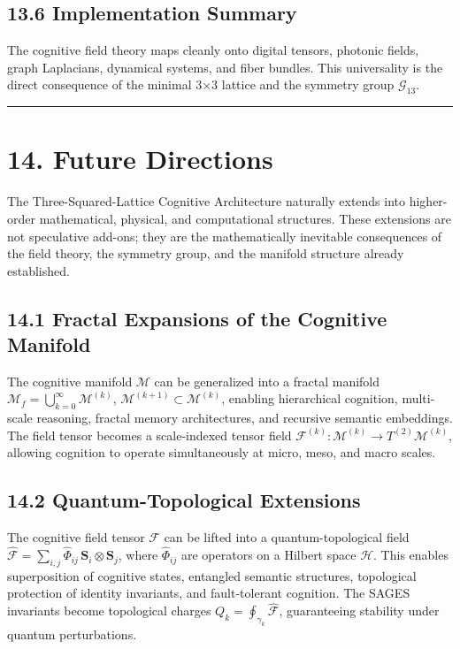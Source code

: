 \subsection{13.6 Implementation Summary}\label{implementation-summary}

The cognitive field theory maps cleanly onto digital tensors, photonic fields, graph Laplacians, dynamical systems, and fiber bundles. This universality is the direct consequence of the minimal 3×3 lattice and the symmetry group \(\mathcal{G}_{13}\).

\begin{center}\rule{0.5\linewidth}{0.5pt}\end{center}

\section{14. Future Directions}\label{future-directions}

The Three-Squared-Lattice Cognitive Architecture naturally extends into higher-order mathematical, physical, and computational structures. These extensions are not speculative add-ons; they are the mathematically inevitable consequences of the field theory, the symmetry group, and the manifold structure already established.

\subsection{14.1 Fractal Expansions of the Cognitive Manifold}\label{fractal-expansions-of-the-cognitive-manifold}

The cognitive manifold \(\mathcal{M}\) can be generalized into a fractal manifold \(\mathcal{M}_f = \bigcup_{k=0}^{\infty} \mathcal{M}^{(k)}\), \(\mathcal{M}^{(k+1)} \subset \mathcal{M}^{(k)}\), enabling hierarchical cognition, multi-scale reasoning, fractal memory architectures, and recursive semantic embeddings. The field tensor becomes a scale-indexed tensor field \(\mathcal{F}^{(k)} : \mathcal{M}^{(k)} \rightarrow T^{(2)}\mathcal{M}^{(k)}\), allowing cognition to operate simultaneously at micro, meso, and macro scales.

\subsection{14.2 Quantum-Topological Extensions}\label{quantum-topological-extensions}

The cognitive field tensor \(\mathcal{F}\) can be lifted into a quantum-topological field \(\widehat{\mathcal{F}} = \sum_{i,j} \widehat{\Phi}_{ij} \, \mathbf{S}_i \otimes \mathbf{S}_j\), where \(\widehat{\Phi}_{ij}\) are operators on a Hilbert space \(\mathcal{H}\). This enables superposition of cognitive states, entangled semantic structures, topological protection of identity invariants, and fault-tolerant cognition. The SAGES invariants become topological charges \(Q_k = \oint_{\gamma_k} \widehat{\mathcal{F}}\), guaranteeing stability under quantum perturbations.

